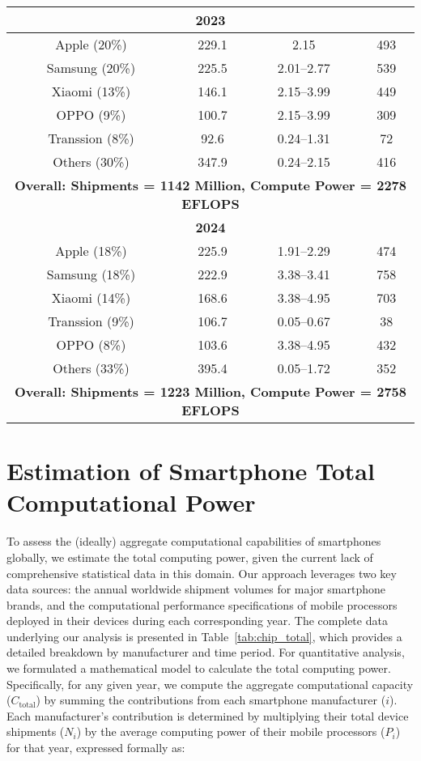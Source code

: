 \begin{table}[h!]
{\begin{tabular}{cccc}
\multicolumn{4}{c}{\textbf{2023}} \\ \hline
Apple (20\%)   & 229.1 & 2.15 & 493 \\
Samsung (20\%) & 225.5 & 2.01--2.77 & 539 \\
Xiaomi (13\%)  & 146.1 & 2.15--3.99 & 449 \\
OPPO (9\%)     & 100.7 & 2.15--3.99 & 309 \\
Transsion (8\%)  & 92.6 & 0.24--1.31 & 72 \\
Others (30\%)  & 347.9 & 0.24--2.15 & 416 \\
\hline
\multicolumn{4}{c}{\textbf{Overall: Shipments = 1142 Million, Compute Power = 2278 EFLOPS}} \\ \hline \hline

\multicolumn{4}{c}{\textbf{2024}} \\ \hline
Apple (18\%)   & 225.9 & 1.91--2.29 & 474 \\
Samsung (18\%) & 222.9 & 3.38--3.41 & 758 \\
Xiaomi (14\%)  & 168.6 & 3.38--4.95 & 703 \\
Transsion (9\%)  & 106.7 & 0.05--0.67 & 38  \\
OPPO (8\%)   & 103.6 & 3.38--4.95 & 432 \\
Others (33\%)  & 395.4 & 0.05--1.72 & 352 \\
\hline
\multicolumn{4}{c}{\textbf{Overall: Shipments = 1223 Million, Compute Power = 2758 EFLOPS}} \\ \hline
\end{tabular}%
}
\end{table}

\section{Estimation of Smartphone Total Computational Power}  
\label{app:total_computation}

To assess the (ideally) aggregate computational capabilities of smartphones globally, we estimate the total computing power, given the current lack of comprehensive statistical data in this domain. Our approach leverages two key data sources: the annual worldwide shipment volumes for major smartphone brands, and the computational performance specifications of mobile processors deployed in their devices during each corresponding year. The complete data underlying our analysis is presented in Table~\ref{tab:chip_total}, which provides a detailed breakdown by manufacturer and time period.
For quantitative analysis, we formulated a mathematical model to calculate the total computing power. Specifically, for any given year, we compute the aggregate computational capacity ($C_{\text{total}}$) by summing the contributions from each smartphone manufacturer ($i$). Each manufacturer's contribution is determined by multiplying their total device shipments ($N_i$) by the average computing power of their mobile processors ($P_i$) for that year, expressed formally as:

